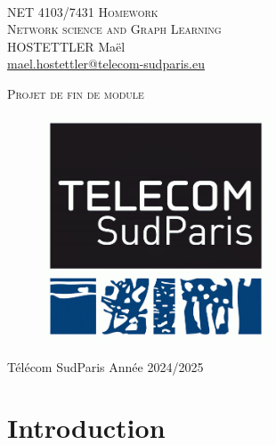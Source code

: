 \documentclass{article}
\begin{document}
\begin{titlepage}
    \begin{center}
        \textsc{\LARGE }\\[1.5cm]
        \vspace*{0.40cm}
        \textsc{\LARGE{NET 4103/7431 Homework \\
        Network science and Graph Learning}}\\
        \vspace*{0.40cm}
        \large{HOSTETTLER Maël\\}
        \href{mailto:mael.hostettler@telecom-sudparis.eu}{mael.hostettler@telecom-sudparis.eu}
        \vspace*{1cm}
        
        \textsc{\small{Projet de fin de module}}\\[1cm]
    \end{center}
    
    \vspace*{0.5cm}
    
    \begin{figure}[h]
        \begin{center}
            \includegraphics[width=0.6\textwidth]{assets/logoTSP.png}
        \end{center}
    \end{figure}
    
    \vfill

    Télécom SudParis \hfill Année 2024/2025

\end{titlepage}

\newpage
\tableofcontents
\newpage

\section{Introduction}
\end{document}
